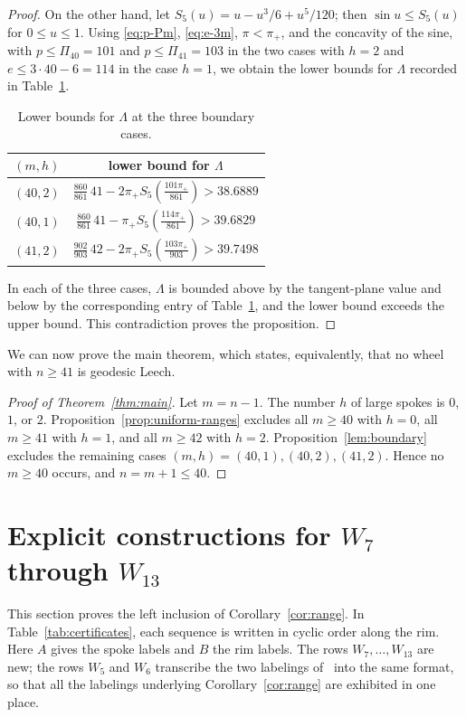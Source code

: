 \documentclass[11pt]{article}
\theoremstyle{definition}
\theoremstyle{remark}
\numberwithin{equation}{section}
\begin{document}
\begin{proof}
On the other hand, let $S_5(u)=u-u^3/6+u^5/120$; then $\sin u\le S_5(u)$ for $0\le u\le1$. Using \eqref{eq:p-Pm}, \eqref{eq:e-3m}, $\pi<\pi_+$, and the concavity of the sine,
with $p\le\Pi_{40}=101$ and $p\le\Pi_{41}=103$ in the two cases with $h=2$ and
$e\le3\cdot40-6=114$ in the case $h=1$, we obtain the lower bounds for $\Lambda$ recorded in Table~\ref{tab:lambda-lower}.
\begin{table}[ht]
\centering
\caption{Lower bounds for $\Lambda$ at the three boundary
cases.}\label{tab:lambda-lower}
\begin{tabular}{c@{\qquad}c}
\toprule
$(m,h)$ & lower bound for $\Lambda$\\
\midrule
$(40,2)$ &
$\displaystyle
\frac{860}{861}\,41
-2\pi_+S_5\!\left(\frac{101\pi_+}{861}\right)
>38.6889$\\[3mm]
$(40,1)$ &
$\displaystyle
\frac{860}{861}\,41
-\pi_+S_5\!\left(\frac{114\pi_+}{861}\right)
>39.6829$\\[3mm]
$(41,2)$ &
$\displaystyle
\frac{902}{903}\,42
-2\pi_+S_5\!\left(\frac{103\pi_+}{903}\right)
>39.7498$\\
\bottomrule
\end{tabular}
\end{table}
In each of the three cases, $\Lambda$ is bounded above by the tangent-plane value and below by the corresponding entry of Table~\ref{tab:lambda-lower}, and the lower bound exceeds the upper bound. This contradiction proves the proposition.
\end{proof}

We can now prove the main theorem, which states, equivalently, that no wheel with $n\ge41$ is geodesic Leech.

\begin{proof}[Proof of Theorem~\ref{thm:main}]
Let $m=n-1$. The number $h$ of large spokes is $0$, $1$, or $2$. Proposition~\ref{prop:uniform-ranges} excludes all $m\ge40$ with $h=0$, all $m\ge41$ with $h=1$, and all $m\ge42$ with $h=2$. Proposition~\ref{lem:boundary} excludes the remaining cases $(m,h)=(40,1),(40,2),(41,2)$. Hence no $m\ge40$ occurs, and $n=m+1\le40$.
\end{proof}

\section{\texorpdfstring{Explicit constructions for $W_7$ through $W_{13}$}{Explicit constructions for W7 through W13}}\label{sec:certificates}

This section proves the left inclusion of Corollary~\ref{cor:range}. In Table~\ref{tab:certificates}, each sequence is written in cyclic order along the rim. Here $A$ gives the spoke labels and $B$ the rim labels. The rows $W_7,\ldots,W_{13}$ are new; the rows $W_5$ and $W_6$ transcribe the two labelings of~\cite[Figure~3]{LakshmananManattu2025} into the same format, so that all the labelings underlying Corollary~\ref{cor:range} are exhibited in one place.
\end{document}
